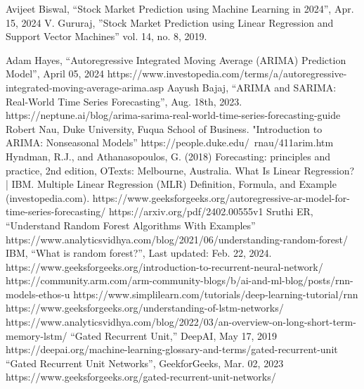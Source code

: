 \documentclass{ieeeojies}
\begin{document}
   
\begin{thebibliography}{00}
 Avijeet Biswal, “Stock Market Prediction using Machine Learning in 2024”, Apr. 15, 2024
 V. Gururaj, ”Stock Market Prediction using Linear Regression and Support Vector Machines” vol. 14, no. 8, 2019.

 Adam Hayes, “Autoregressive Integrated Moving Average (ARIMA) Prediction Model”, April 05, 2024
https://www.investopedia.com/terms/a/autoregressive-integrated-moving-average-arima.asp
 Aayush Bajaj, “ARIMA and SARIMA: Real-World Time Series Forecasting”, Aug. 18th, 2023.
https://neptune.ai/blog/arima-sarima-real-world-time-series-forecasting-guide
 Robert Nau, Duke University, Fuqua School of Business. "Introduction to ARIMA: Nonseasonal Models”
https://people.duke.edu/~rnau/411arim.htm
 Hyndman, R.J., and Athanasopoulos, G. (2018) Forecasting: principles and practice, 2nd edition, OTexts: Melbourne, Australia. 
 What Is Linear Regression? | IBM.
 Multiple Linear Regression (MLR) Definition, Formula, and Example (investopedia.com).
 https://www.geeksforgeeks.org/autoregressive-ar-model-for-time-series-forecasting/
https://arxiv.org/pdf/2402.00555v1
 Sruthi ER, “Understand Random Forest Algorithms With Examples”
https://www.analyticsvidhya.com/blog/2021/06/understanding-random-forest/
 IBM, “What is random forest?”, Last updated: Feb. 22, 2024.
 https://www.geeksforgeeks.org/introduction-to-recurrent-neural-network/
 https://community.arm.com/arm-community-blogs/b/ai-and-ml-blog/posts/rnn-models-ethos-u
  https://www.simplilearn.com/tutorials/deep-learning-tutorial/rnn
https://www.geeksforgeeks.org/understanding-of-lstm-networks/
https://www.analyticsvidhya.com/blog/2022/03/an-overview-on-long-short-term-memory-lstm/
“Gated Recurrent Unit,” DeepAI, May 17, 2019 https://deepai.org/machine-learning-glossary-and-terms/gated-recurrent-unit
“Gated Recurrent Unit Networks”, GeekforGeeks, Mar. 02, 2023 https://www.geeksforgeeks.org/gated-recurrent-unit-networks/
\end{thebibliography}


\EOD
\end{document}

